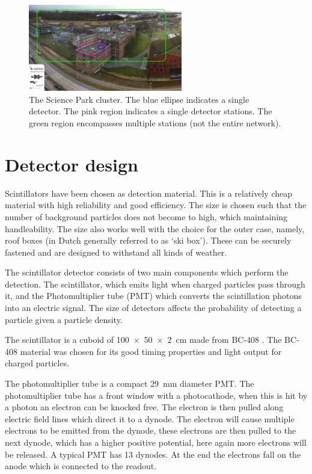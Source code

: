 \begin{figure}
    \centering
    \includegraphics[width=0.6\textwidth]
                    {plots/experiment/ADL_151373_151429_layers}
    \caption{The Science Park cluster. The blue ellipse indicates a single detector. The pink region indicates a single detector stations. The green region encompasses multiple stations (not the entire \hisparc network).}
    \label{fig:sciencepark-layers}
\end{figure}


\section{Detector design}
\label{sec:detector-design}

Scintillators have been chosen as detection material. This is a relatively cheap material with high reliability and good efficiency. The size is chosen such that the number of background particles does not become to high, which maintaining handleability. The size also works well with the choice for the outer case, namely, roof boxes (in Dutch generally referred to as `ski box'). These can be securely fastened and are designed to withstand all kinds of weather.

The scintillator detector consists of two main components which perform the detection. The scintillator, which emits light when charged particles pass through it, and the Photomultiplier tube (PMT) which converts the scintillation photons into an electric signal. The size of detectors affects the probability of detecting a particle given a particle density.

The scintillator is a cuboid of \SI[product-units=power]{100 x 50 x 2}{\centi\meter} made from BC-408 \cite{bc408}. The BC-408 material was chosen for its good timing properties and light output for charged particles.

The photomultiplier tube \cite{et:pmt} is a compact \SI{29}{\milli\meter} diameter PMT. The photomultiplier tube has a front window with a photocathode, when this is hit by a photon an electron can be knocked free. The electron is then pulled along electric field lines which direct it to a dynode. The electron will cause multiple electrons to be emitted from the dynode, these electrons are then pulled to the next dynode, which has a higher positive potential, here again more electrons will be released. A typical PMT has 13 dynodes. At the end the electrons fall on the anode which is connected to the readout.

